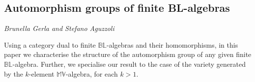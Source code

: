 \documentclass[../booklet.tex]{subfiles}
\begin{document}
\subsection[Automorphism groups of finite BL-algebras. {\it Brunella Gerla and Stefano Aguzzoli}]{Automorphism groups of finite BL-algebras}
 

\begin{center}
  {\it Brunella Gerla and Stefano Aguzzoli}
\end{center}



Using a category dual to finite $\mathbb{BL}$-algebras and their homomorphisms,
in this paper
we characterise the structure of the automorphism group of any given finite $\mathbb{BL}$-algebra.
Further, we specialise
our result to the case of the variety generated by the $k$-element $\mathbb{MV}$-algebra, for each $k > 1$.

\end{document}
